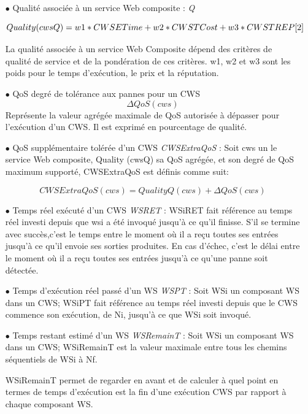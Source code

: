 \begin{itemize}
\item [$\bullet$] Qualité associée à un service Web composite : \textit{Q} 

$$
 Quality(cwsQ) = w1 \ast CWSETime + w2 \ast CWSTCost + w3 \ast CWSTREP   \cite{2}
$$
 
 La qualité associée à un service Web Composite dépend des critères de qualité de service et de la pondération de ces critères. w1, w2 et w3 sont les poids pour le temps d'exécution, le prix et la réputation.
 
\item [$\bullet$] QoS degré de tolérance aux pannes pour un CWS \textit{ $$ \Delta QoS(cws) $$ }  Représente la valeur agrégée maximale de QoS autorisée à dépasser pour l'exécution d'un CWS. Il est exprimé en pourcentage de qualité.

\item [$\bullet$] QoS supplémentaire tolérée d'un CWS  \textit{CWSExtraQoS}  : Soit cws un le service Web composite, Quality (cwsQ) sa QoS agrégée, et son degré de QoS maximum supporté, CWSExtraQoS est définis comme suit: 

  $$ CWSExtraQoS(cws) = QualityQ(cws) + \Delta QoS(cws) $$
 
\item [$\bullet$] Temps réel exécuté d'un CWS \textit{WSRET} : WSiRET fait référence au temps réel investi depuis que wsi a été invoqué jusqu'à ce qu'il finisse. S'il se termine avec succès,c'est le temps entre le moment où il a reçu toutes ses entrées jusqu'à ce qu'il envoie ses sorties produites. En cas d'échec, c'est le délai entre le moment où il a reçu toutes ses entrées jusqu'à ce qu'une panne soit détectée.


\item [$\bullet$]Temps d'exécution réel passé d'un WS  \textit{WSPT} : Soit WSi un composant WS dans un CWS; WSiPT fait référence au temps réel investi depuis que le CWS commence son exécution, de Ni, jusqu'à ce que WSi soit invoqué.

\item [$\bullet$] Temps restant estimé d'un WS  \textit{WSRemainT} : Soit WSi un composant WS dans un CWS; WSiRemainT est la valeur maximale entre tous les chemins séquentiels de WSi à Nf.

WSiRemainT permet de regarder en avant et de calculer à quel point en termes de temps d'exécution est la fin d'une exécution CWS par rapport à chaque composant WS.


\end{itemize}
